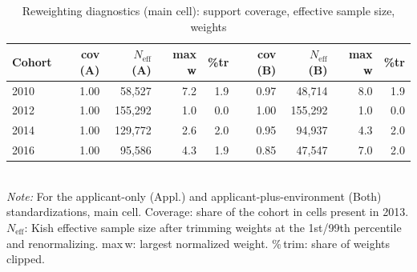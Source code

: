 \begin{table}[htbp]\centering
\caption{Reweighting diagnostics (main cell): support coverage, effective sample size, weights}
\label{tab:P3weights}
\footnotesize
\setlength{\tabcolsep}{4pt}
\begin{tabular}{lrrrrrrrr}
\toprule
Cohort & cov (A) & $N_{\mathrm{eff}}$ (A) & max w & \%tr & cov (B) & $N_{\mathrm{eff}}$ (B) & max w & \%tr \\
\midrule
2010 & 1.00 & 58,527 & 7.2 & 1.9 & 0.97 & 48,714 & 8.0 & 1.9 \\
2012 & 1.00 & 155,292 & 1.0 & 0.0 & 1.00 & 155,292 & 1.0 & 0.0 \\
2014 & 1.00 & 129,772 & 2.6 & 2.0 & 0.95 & 94,937 & 4.3 & 2.0 \\
2016 & 1.00 & 95,586 & 4.3 & 1.9 & 0.85 & 47,547 & 7.0 & 2.0 \\
\bottomrule
\end{tabular}
\\[3pt]{\footnotesize \textit{Note:} For the applicant-only (Appl.) and applicant-plus-environment (Both) standardizations, main cell. Coverage: share of the cohort in cells present in 2013. $N_{\mathrm{eff}}$: Kish effective sample size after trimming weights at the 1st/99th percentile and renormalizing. max\,w: largest normalized weight. \%\,trim: share of weights clipped.}
\end{table}
